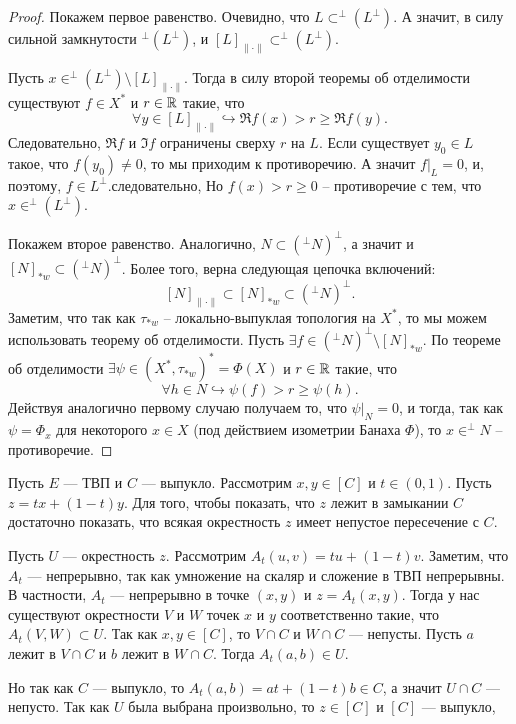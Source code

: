 \begin{proof}
    Покажем первое равенство.
    Очевидно, что $L \subset ^{\perp}(L^\perp)$.
    А значит, в силу сильной замкнутости $^\perp (L^\perp)$, и $[L]_{\|\cdot\|} \subset ^\perp (L^\perp)$.

    Пусть $x \in ^\perp(L^\perp) \setminus [L]_{\|\cdot\|}$.
    Тогда в силу второй теоремы об отделимости существуют $f \in X^*$ и $r \in \mathbb{R}$ такие, что
    \[
        \forall y \in [L]_{\|\cdot\|} \hookrightarrow \Re f(x) > r \geq \Re f(y).
    \]
    Следовательно, $\Re f$ и $\Im f$ ограничены сверху $r$ на $L$.
    Если существует $y_0 \in L$ такое, что $f(y_0) \neq 0$, то мы приходим к противоречию.
    А значит $f|_L = 0$, и, поэтому, $f \in L^\perp$.следовательно,
    Но $f(x) > r \geq 0$ -- противоречие с тем, что $x \in ^\perp(L^\perp)$.

    Покажем второе равенство.
    Аналогично, $N \subset (^\perp N)^\perp$, а значит и $[N]_{*w} \subset (^\perp N)^\perp$.
    Более того, верна следующая цепочка включений:
    \[
        [N]_{\|\cdot\|} \subset [N]_{*w} \subset (^\perp N)^{\perp}.
    \]
    Заметим, что так как $\tau_{*w}$ -- локально-выпуклая топология на $X^*$, то мы можем использовать теорему об отделимости.
    Пусть $\exists f \in (^\perp N)^\perp \setminus [N]_{*w}$.
    По теореме об отделимости $\exists \psi \in (X^*, \tau_{*w})^* = \Phi(X)$ и $r \in \mathbb{R}$ такие, что
    \[
        \forall h \in N \hookrightarrow \psi(f) > r \geq \psi(h).
    \]
    Действуя аналогично первому случаю получаем то, что $\psi|_{N} = 0$, и тогда, так как $\psi = \Phi_x$ для некоторого $x \in X$ (под действием изометрии Банаха $\Phi$), то $x \in ^\perp N$ -- противоречие.
\end{proof}
\begin{notet}
    Пусть $E$ — ТВП и $C$ — выпукло. Рассмотрим $x, y \in [C]$ и $t \in (0, 1)$. Пусть $z = tx + (1 - t)y$. Для того, чтобы показать, что $z$ лежит в замыкании $C$ достаточно показать, что всякая окрестность $z$ имеет непустое пересечение с $C$.

    Пусть $U$ — окрестность $z$. Рассмотрим $A_t(u, v) = tu + (1 - t)v$. Заметим, что $A_t$ — непрерывно, так как умножение на скаляр и сложение в ТВП непрерывны. В частности, $A_t$ — непрерывно в точке $(x, y)$ и $z = A_t(x, y)$. Тогда у нас существуют окрестности $V$ и $W$ точек $x$ и $y$ соответственно такие, что $A_t(V, W) \subset U$. Так как $x, y \in [C]$, то $V \cap C$ и $W \cap C$ — непусты. Пусть $a$ лежит в $V \cap C$ и $b$ лежит в $W \cap C$. Тогда $A_t(a, b) \in U$.
    
    Но так как $C$ — выпукло, то $A_t(a, b) = at + (1 - t)b \in C$, а значит $U \cap C$ — непусто. Так как $U$ была выбрана произвольно, то $z \in [C]$ и $[C]$ — выпукло,
\end{notet}
